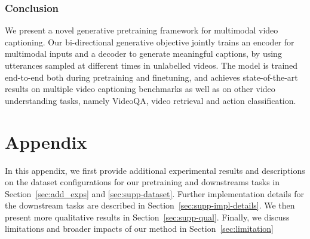 \documentclass[10pt,twocolumn,letterpaper]{article}
\begin{document}
\begin{table}[t]
    \centering
    \caption{Action classification results on Kinetics with different ViViT initializations. MV-GPT refers to a model initalised with our MV-GPT pretraining on HowTo100M with \textit{no manually annotated} labels. We use a  factorized encoder ViViT-Base following \cite{arnab2021vivit}, but use a tubelet size of  instead of .}
    \label{tab:kinetics}
    \vspace{-0.3cm}
\end{table}


 \section{Conclusion}
We present a novel generative pretraining framework for multimodal video captioning. Our bi-directional generative objective jointly trains an encoder for multimodal inputs and a decoder to generate meaningful captions, by using utterances sampled at different times in unlabelled videos. The model is trained end-to-end both during pretraining and finetuning, and achieves state-of-the-art results on multiple video captioning benchmarks as well as  on other video understanding tasks, namely VideoQA, video retrieval and action classification. 






 
{\small


}

\clearpage

\appendix

\part{Appendix} 

In this appendix, we first provide additional experimental results and  descriptions on the dataset configurations for our pretraining and downstreams tasks in Section~\ref{sec:add_exps} and \ref{sec:supp-dataset}.
Further implementation details for the downstream tasks are described in Section~\ref{sec:supp-impl-details}.
We then present more qualitative results in Section~\ref{sec:supp-qual}.
Finally, we discuss limitations and broader impacts of our method in Section~\ref{sec:limitation} 
\end{document}
